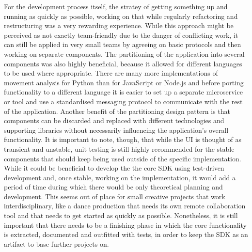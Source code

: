 For the development process itself, the stratey of getting something up and running as quickly as possible, working on that while regularly refactoring and restructuring was a very rewarding experience.
While this approach might be perceived as not exactly team-friendly due to the danger of conflicting work, it can still be applied in very small teams by agreeing on basic protocols and then working on separate components.
The partitioning of the application into several components was also highly beneficial, because it allowed for different languages to be used where appropriate.
There are many more implementations of movement analysis for Python than for JavaScript or Node.js and before porting functionality to a different language it is easier to set up a separate microservice or tool and use a standardised messaging protocol to communicate with the rest of the application.
Another benefit of the partitioning design pattern is that components can be discarded and replaced with different technologies and supporting libraries without necessarily influencing the application's overall functionality.
It is important to note, though, that while the \ac{UI} is thought of as transient and unstable, unit testing is still highly recommended for the stable components that should keep being used outside of the specific implementation.
While it could be beneficial to develop the the core \ac{SDK} using test-driven development and, once stable, working on the implementation, it would add a period of time during which there would be only theoretical planning and development.
This seems out of place for small creative projects that work interdisciplinary, like a dance production that needs its own remote collaboration tool and that needs to get started as quickly as possible.
Nonetheless, it is still important that there needs to be a finishing phase in which the core functionality is extracted, documented and outfitted with tests, in order to keep the \ac{SDK} as an artifact to base further projects on.
